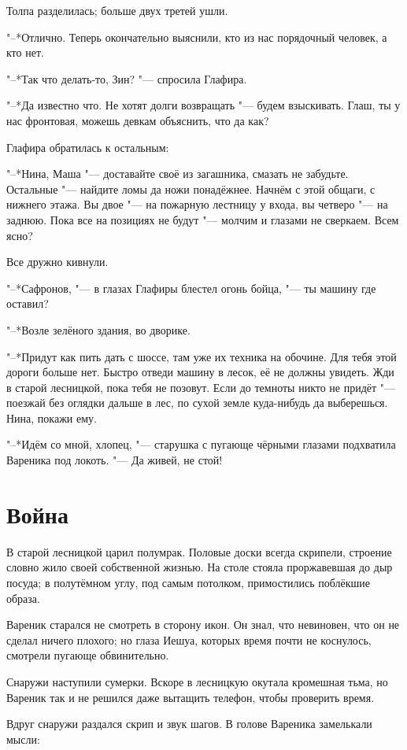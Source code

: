 Толпа разделилась;
больше двух третей ушли.

"--*Отлично.
Теперь окончательно выяснили, кто из нас порядочный человек, а кто нет.

"--*Так что делать-то, Зин? "--- спросила Глафира.

"--*Да известно что.
Не хотят долги возвращать "--- будем взыскивать.
Глаш, ты у нас фронтовая, можешь девкам объяснить, что да как?

Глафира обратилась к остальным:

"--*Нина, Маша "--- доставайте своё из загашника, смазать не забудьте.
Остальные "--- найдите ломы да ножи понадёжнее.
Начнём с этой общаги, с нижнего этажа.
Вы двое "--- на пожарную лестницу у входа, вы четверо "--- на заднюю.
Пока все на позициях не будут "--- молчим и глазами не сверкаем.
Всем ясно?

Все дружно кивнули.

"--*Сафронов, "--- в глазах Глафиры блестел огонь бойца, "--- ты машину где оставил?

"--*Возле зелёного здания, во дворике.

"--*Придут как пить дать с шоссе, там уже их техника на обочине.
Для тебя этой дороги больше нет.
Быстро отведи машину в лесок, её не должны увидеть.
Жди в старой лесницкой, пока тебя не позовут.
Если до темноты никто не придёт "--- поезжай без оглядки дальше в лес, по сухой земле куда-нибудь да выберешься.
Нина, покажи ему.

"--*Идём со мной, хлопец, "--- старушка с пугающе чёрными глазами подхватила Вареника под локоть.
"--- Да живей, не стой!

\section{Война}

В старой лесницкой царил полумрак.
Половые доски всегда скрипели, строение словно жило своей собственной жизнью.
На столе стояла проржавевшая до дыр посуда;
в полутёмном углу, под самым потолком, примостились поблёкшие образа.

Вареник старался не смотреть в сторону икон.
Он знал, что невиновен, что он не сделал ничего плохого;
но глаза Иешуа, которых время почти не коснулось, смотрели пугающе обвинительно.

Снаружи наступили сумерки.
Вскоре в лесницкую окутала кромешная тьма, но Вареник так и не решился даже вытащить телефон, чтобы проверить время.

Вдруг снаружи раздался скрип и звук шагов.
В голове Вареника замелькали мысли:

